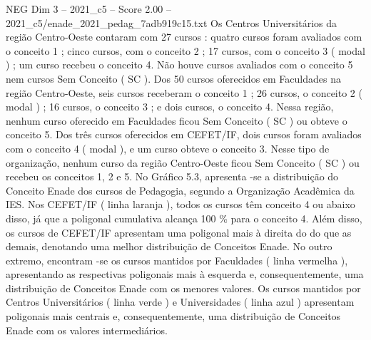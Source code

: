 \begin{textsample}{NEG Dim 3 – 2021\_c5 – Score 2.00 – 2021\_c5/enade\_2021\_pedag\_7adb919c15.txt}
Os Centros Universitários da região Centro-Oeste contaram com 27 cursos : quatro cursos foram avaliados com o conceito 1 ; cinco cursos, com o conceito 2 ; 17 cursos, com o conceito 3 ( modal ) ; um curso recebeu o conceito 4.
Não houve cursos avaliados com o conceito 5 nem cursos Sem Conceito ( SC ).
Dos 50 cursos oferecidos em Faculdades na região Centro-Oeste, seis cursos receberam o conceito 1 ; 26 cursos, o conceito 2 ( modal ) ; 16 cursos, o conceito 3 ; e dois cursos, o conceito 4.
Nessa região, nenhum curso oferecido em Faculdades ficou Sem Conceito ( SC ) ou obteve o conceito 5.
Dos três cursos oferecidos em CEFET/IF, dois cursos foram avaliados com o conceito 4 ( modal ), e um curso obteve o conceito 3.
Nesse tipo de organização, nenhum curso da região Centro-Oeste ficou Sem Conceito ( SC ) ou recebeu os conceitos 1, 2 e 5.
No Gráfico 5.3, apresenta -se a distribuição do Conceito Enade dos cursos de Pedagogia, segundo a Organização Acadêmica da IES.
Nos CEFET/IF ( linha laranja ), todos os cursos têm conceito 4 ou abaixo disso, já que a poligonal cumulativa alcança 100 \% para o conceito 4.
Além disso, os cursos de CEFET/IF apresentam uma poligonal mais à direita do do que as demais, denotando uma melhor distribuição de Conceitos Enade.
No outro extremo, encontram -se os cursos mantidos por Faculdades ( linha vermelha ), apresentando as respectivas poligonais mais à esquerda e, consequentemente, uma distribuição de Conceitos Enade com os menores valores.
Os cursos mantidos por Centros Universitários ( linha verde ) e Universidades ( linha azul ) apresentam poligonais mais centrais e, consequentemente, uma distribuição de Conceitos Enade com os valores intermediários.

\end{textsample}
